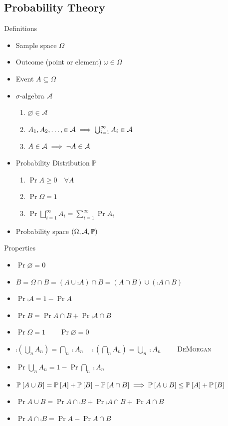 \documentclass[landscape]{article}
\begin{document}
\begin{multicols*}{2}

\section{Probability Theory}

Definitions
\begin{itemize}
  \item Sample space $\Omega$
  \item Outcome (point or element) $\omega \in \Omega$
  \item Event $A \subseteq \Omega$
  \item $\sigma$-algebra $\mathcal{A}$
    \begin{enumerate}
      \item $\varnothing \in \mathcal{A}$
      \item $A_1,A_2,\dots, \in \mathcal{A}
        \;\Longrightarrow\; \bigcup_{i=1}^\infty A_i \in \mathcal{A}$
      \item $A \in \mathcal{A} \;\Longrightarrow\; \neg{A} \in \mathcal{A}$
    \end{enumerate}
  \item Probability Distribution $\mathbb{P}$
    \begin{enumerate}
      \item $\Pr{A} \ge 0 \quad \forall A$
      \item $\Pr{\Omega} = 1$
      \item $\Pr{\displaystyle\bigsqcup_{i=1}^\infty A_i}
        = \displaystyle\sum_{i=1}^\infty \Pr{A_i}$
    \end{enumerate}
  \item Probability space $(\Omega,\mathcal{A},\mathbb{P})$
\end{itemize}

Properties
\begin{itemize}
  \item $\Pr{\varnothing} = 0$
  \item $B = \Omega \cap B = (A \cup \comp{A}) \cap B
    = (A \cap B) \cup (\comp{A} \cap B)$
  \item $\Pr{\comp{A}} = 1 - \Pr{A}$
  \item $\Pr{B} = \Pr{A \cap B} + \Pr{\comp{A} \cap B}$
  \item $\Pr{\Omega} = 1 \qquad \Pr{\varnothing} = 0$
  \item $\comp{\left(\bigcup_n A_n\right)} = \bigcap_n \comp{A_n}
    \quad
    \comp{\left(\bigcap_n A_n\right)} = \bigcup_n \comp{A_n}
    \qquad$
    \textsc{DeMorgan}
  \item $\Pr{\bigcup_n A_n}
    = 1 - \Pr{\bigcap_n \comp{A_n}}$
  \item $\mathbb{P}_{}\left[A \cup B\right] = \mathbb{P}_{}\left[A\right] + \mathbb{P}_{}\left[B\right] - \mathbb{P}_{}\left[A \cap B\right]\\[1ex]
    \;\Longrightarrow\; \mathbb{P}_{}\left[A \cup B\right] \le \mathbb{P}_{}\left[A\right] + \mathbb{P}_{}\left[B\right]$
  \item $\Pr{A \cup B}
    = \Pr{A \cap \comp{B}} + \Pr{\comp{A} \cap B} + \Pr{A \cap B}$
  \item $\Pr{A \cap \comp{B}} = \Pr{A} - \Pr{A \cap B}$
\end{itemize}


\end{multicols*}
\end{document}
